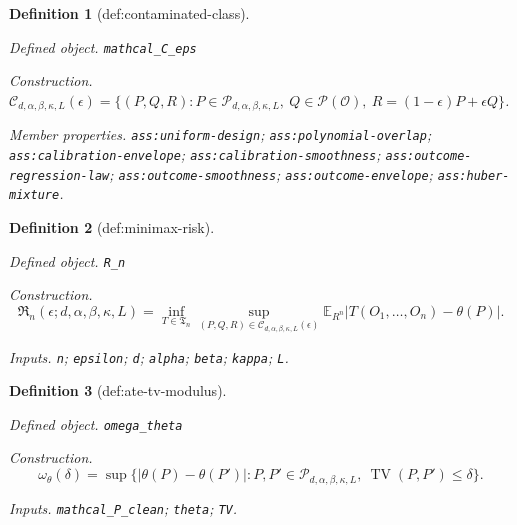\documentclass{article}
\newtheorem{definition}{Definition}
\begin{document}
\begin{definition}[def:contaminated-class]\label{def:contaminated-class}
\par\smallskip\noindent\emph{Defined object.} \texttt{mathcal\_\allowbreak{}C\_\allowbreak{}eps}
\par\smallskip\noindent\emph{Construction.} \(\mathcal C_{d,\alpha,\beta,\kappa,L}(\epsilon)=\{(P,Q,R):P\in\mathcal P_{d,\alpha,\beta,\kappa,L},\ Q\in\mathcal P(\mathcal O),\ R=(1-\epsilon)P+\epsilon Q\}\).
\par\smallskip\noindent\emph{Member properties.} \texttt{ass:\allowbreak{}uniform-\allowbreak{}design}; \texttt{ass:\allowbreak{}polynomial-\allowbreak{}overlap}; \texttt{ass:\allowbreak{}calibration-\allowbreak{}envelope}; \texttt{ass:\allowbreak{}calibration-\allowbreak{}smoothness}; \texttt{ass:\allowbreak{}outcome-\allowbreak{}regression-\allowbreak{}law}; \texttt{ass:\allowbreak{}outcome-\allowbreak{}smoothness}; \texttt{ass:\allowbreak{}outcome-\allowbreak{}envelope}; \texttt{ass:\allowbreak{}huber-\allowbreak{}mixture}.
\end{definition}

\begin{definition}[def:minimax-risk]\label{def:minimax-risk}
\par\smallskip\noindent\emph{Defined object.} \texttt{R\_\allowbreak{}n}
\par\smallskip\noindent\emph{Construction.} \[\mathfrak R_n(\epsilon;d,\alpha,\beta,\kappa,L)=\inf_{T\in\mathfrak T_n}\sup_{(P,Q,R)\in\mathcal C_{d,\alpha,\beta,\kappa,L}(\epsilon)}\mathbb E_{R^n}|T(O_1,\ldots,O_n)-\theta(P)|.\]
\par\smallskip\noindent\emph{Inputs.} \texttt{n}; \texttt{epsilon}; \texttt{d}; \texttt{alpha}; \texttt{beta}; \texttt{kappa}; \texttt{L}.
\end{definition}

\begin{definition}[def:ate-tv-modulus]\label{def:ate-tv-modulus}
\par\smallskip\noindent\emph{Defined object.} \texttt{omega\_\allowbreak{}theta}
\par\smallskip\noindent\emph{Construction.} \[\omega_\theta(\delta)=\sup\{|\theta(P)-\theta(P')|:P,P'\in\mathcal P_{d,\alpha,\beta,\kappa,L},\ \operatorname{TV}(P,P')\leq\delta\}.\]
\par\smallskip\noindent\emph{Inputs.} \texttt{mathcal\_\allowbreak{}P\_\allowbreak{}clean}; \texttt{theta}; \texttt{TV}.
\end{definition}
\end{document}
